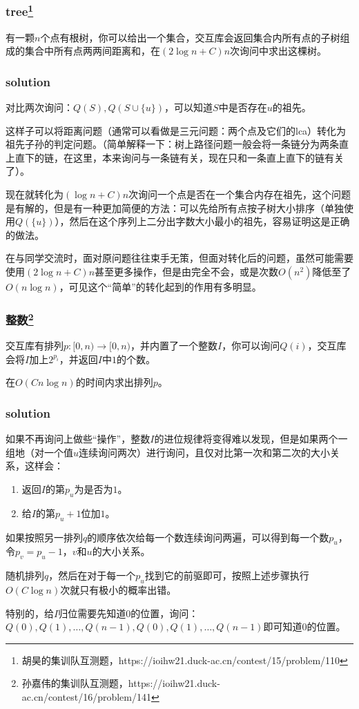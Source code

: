 \documentclass[10pt]{beamer}
\begin{document}
	\clearpage
	\begin{frame}
		\frametitle{tree\footnote[1]{胡昊的集训队互测题，https://ioihw21.duck-ac.cn/contest/15/problem/110}}
	
		有一颗$n$个点有根树，你可以给出一个集合，交互库会返回集合内所有点的子树组成的集合中所有点两两间距离和，在$(2\log n+C)n$次询问中求出这棵树。

	\end{frame}
	\clearpage
	\begin{frame}
		\frametitle{solution}
	
		对比两次询问：$Q(S),Q(S\cup\{u\})$，可以知道$S$中是否存在$u$的祖先。

		这样子可以将距离问题（通常可以看做是三元问题：两个点及它们的lca）转化为祖先子孙的判定问题。（简单解释一下：树上路径问题一般会将一条链分为两条直上直下的链，在这里，本来询问与一条链有关，现在只和一条直上直下的链有关了）。

		现在就转化为$(\log n+C)n$次询问一个点是否在一个集合内存在祖先，这个问题是有解的，但是有一种更加简便的方法：可以先给所有点按子树大小排序（单独使用$Q(\{u\})$），然后在这个序列上二分出字数大小最小的祖先，容易证明这是正确的做法。

		在与同学交流时，面对原问题往往束手无策，但面对转化后的问题，虽然可能需要使用$(2\log n+C)n$甚至更多操作，但是由完全不会，或是次数$O(n^2)$降低至了$O(n\log n)$，可见这个“简单”的转化起到的作用有多明显。
	
	\end{frame}
	\clearpage
	\begin{frame}
		\frametitle{整数\footnote[1]{孙嘉伟的集训队互测题，https://ioihw21.duck-ac.cn/contest/16/problem/141}}
	
		交互库有排列$p:[0,n)\rightarrow[0,n)$，并内置了一个整数$I$，你可以询问$Q(i)$，交互库会将$I$加上$2^{p_i}$，并返回$I$中$1$的个数。

		在$O(Cn\log n)$的时间内求出排列$p$。
	
	\end{frame}
	\clearpage
	\begin{frame}
		\frametitle{solution}
	
		如果不再询问上做些“操作”，整数$I$的进位规律将变得难以发现，但是如果两个一组地（对一个值$u$连续询问两次）进行询问，且仅对比第一次和第二次的大小关系，这样会：

		\begin{enumerate}
			\item 返回$I$的第$p_u$为是否为$1$。
			\item 给$I$的第$p_u+1$位加$1$。
		\end{enumerate}

		如果按照另一排列$q$的顺序依次给每一个数连续询问两遍，可以得到每一个数$p_u$，令$p_v=p_u-1$，$v$和$u$的大小关系。

		随机排列$q$，然后在对于每一个$p_u$找到它的前驱即可，按照上述步骤执行$O(C\log n)$次就只有极小的概率出错。

		特别的，给$I$归位需要先知道$0$的位置，询问：$Q(0),Q(1),\dots,Q(n-1),Q(0),Q(1),\dots,Q(n-1)$即可知道$0$的位置。

	\end{frame}
\end{document}
